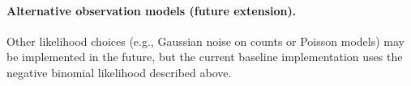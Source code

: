 \paragraph{Alternative observation models (future extension).}
Other likelihood choices (e.g., Gaussian noise on counts or Poisson models) may be implemented in the future,
but the current baseline implementation uses the negative binomial likelihood described above.

